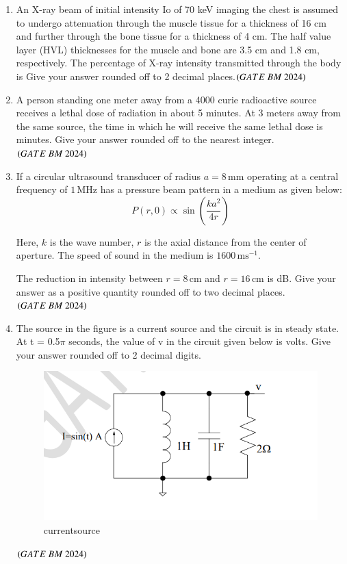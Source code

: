 \documentclass[journal,12pt,onecolumn]{IEEEtran}
\theoremstyle{remark}
\begin{document}
\begin{enumerate}
\item An X-ray beam of initial intensity Io of 70 keV imaging the chest is assumed to undergo
attenuation through the muscle tissue for a thickness of 16 cm and further through the
bone tissue for a thickness of 4 cm. The half value layer (HVL) thicknesses for the
muscle and bone are 3.5 cm and 1.8 cm, respectively. The percentage of X-ray
intensity transmitted through the body is\underline{\hspace{2cm}}
 Give your answer rounded off to 2 decimal places.\hfill $\brak{GATE\ BM\ 2024}$

\item A person standing one meter away from a 4000 curie radioactive source receives a
lethal dose of radiation in about 5 minutes. At 3 meters away from the same source,
the time in which he will receive the same lethal dose is \underline{\hspace{2cm}}
minutes. Give your answer rounded off to the nearest integer.\hfill $\brak{GATE\ BM\ 2024}$

\item If a circular ultrasound transducer of radius $a = 8 \,\text{mm}$ operating at a central frequency of $1 \,\text{MHz}$ has a pressure beam pattern in a medium as given below:
\[
P(r,0) \propto \sin \left(\frac{ka^2}{4r}\right)
\]

Here, $k$ is the wave number, $r$ is the axial distance from the center of aperture. The speed of sound in the medium is $1600 \,\text{ms}^{-1}$.

\bigskip

The reduction in intensity between $r = 8 \,\text{cm}$ and $r = 16 \,\text{cm}$ is \underline{\hspace{2cm}} dB. Give your answer as a positive quantity rounded off to two decimal places.
\hfill $\brak{GATE\ BM\ 2024}$

\item The source in the figure is a current source and the circuit is in steady state. At t =
0.5$\pi$ seconds, the value of v in the circuit given below is \underline{\hspace{2cm}} volts. Give your answer rounded off to 2 decimal digits.
\begin{figure}[H]
\centering
\includegraphics[width=0.4\columnwidth]{Figs/Fig 13.png}
\caption{currentsource}
\label{fig:placeholder}
\end{figure}\hfill $\brak{GATE\ BM\ 2024}$


\end{enumerate}
\end{document}
